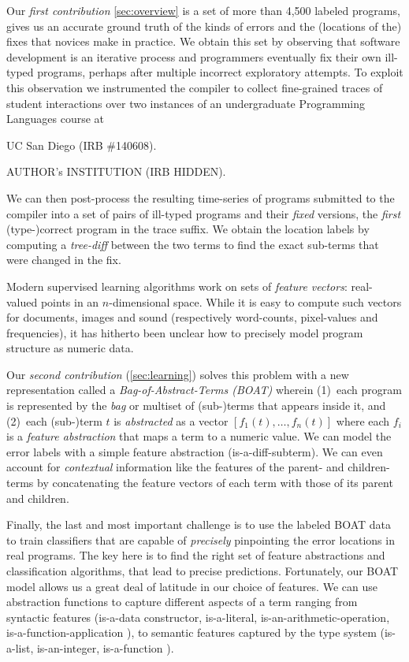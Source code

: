 Our \emph{first contribution} \autoref{sec:overview}
is a set of more than 4,500 labeled programs,
gives us an accurate ground truth of
the kinds of errors and the (locations
of the) fixes that novices make in
practice.
%
We obtain this set by observing that
software development is an iterative
process and programmers eventually
fix their own ill-typed programs,
perhaps after multiple incorrect
exploratory attempts.
%
To exploit this observation we instrumented
the \ocaml compiler to collect fine-grained
traces of student interactions over two instances
of an undergraduate Programming Languages course at
%
\begin{anonsuppress}
UC San Diego (IRB \#140608).
\end{anonsuppress}
\begin{noanonsuppress}
AUTHOR's INSTITUTION (IRB HIDDEN).
\end{noanonsuppress}
%
We can then post-process the resulting time-series
of programs submitted to the \ocaml compiler into
a set of pairs of ill-typed programs and their
\emph{fixed} versions, the \emph{first} (type-)correct
program in the trace suffix.
%
We obtain the location labels by computing a
\emph{tree-diff} between the two terms to find
the exact sub-terms that were changed in the fix.

%
Modern supervised learning algorithms work on sets of
\emph{feature vectors}: real-valued points in an
$n$-dimensional space. While it is easy to compute such
vectors for documents, images and sound (respectively
word-counts, pixel-values and frequencies), it has
hitherto been unclear how to precisely model program
structure as numeric data.

Our \emph{second contribution} (\autoref{sec:learning})
solves this problem with a new representation called
a \emph{Bag-of-Abstract-Terms (BOAT)} wherein
%
(1)~each program is represented by the \emph{bag}
    or multiset of (sub-)terms that appears inside
    it, and
%
(2)~each (sub-)term $t$ is \emph{abstracted} as
    a vector $[f_1(t), \ldots, f_n(t)]$ where
    each $f_i$ is a \emph{feature abstraction}
    that maps a term to a numeric value.
%
We can model the error labels with a simple feature
abstraction (\eg is-a-diff-subterm).
%
We can even account for \emph{contextual} information like
the features of the parent- and children- terms by
concatenating the feature vectors of each term with those
of its parent and children.

%
Finally, the last and most important challenge is to
use the labeled BOAT data to train classifiers that
are capable of \emph{precisely} pinpointing the error
locations in real programs.
%
The key here is to find the right set of feature
abstractions and classification algorithms, that
lead to precise predictions.
%
Fortunately, our BOAT model allows us a great deal of
latitude in our choice of features.
%
We can use abstraction functions to capture different
aspects of a term ranging from
%
syntactic features (\eg is-a-data constructor, is-a-literal,
is-an-arithmetic-operation, is-a-function-application \etc),
%
to semantic features captured by the type system (\eg is-a-list,
is-an-integer, is-a-function \etc).


